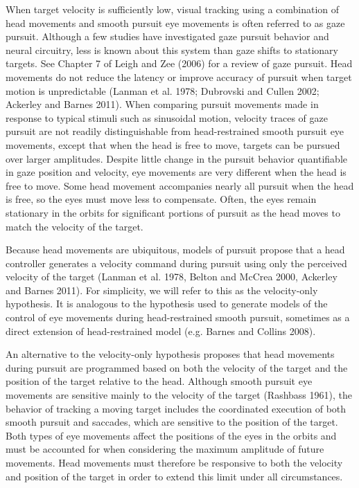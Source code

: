 \documentclass[12pt]{article}
\begin{document}
When target velocity is sufficiently low, visual tracking using a combination of head movements and smooth pursuit eye movements is often referred to as gaze pursuit. Although a few studies have investigated gaze pursuit behavior and neural circuitry, less is known about this system than gaze shifts to stationary targets. See Chapter 7 of Leigh and Zee (2006) for a review of gaze pursuit. Head movements do not reduce the latency or improve accuracy of pursuit when target motion is unpredictable (Lanman et al. 1978; Dubrovski and Cullen 2002; Ackerley and Barnes 2011). When comparing pursuit movements made in response to typical stimuli such as sinusoidal motion, velocity traces of gaze pursuit are not readily distinguishable from head-restrained smooth pursuit eye movements, except that when the head is free to move, targets can be pursued over larger amplitudes. Despite little change in the pursuit behavior quantifiable in gaze position and velocity, eye movements are very different when the head is free to move. Some head movement accompanies nearly all pursuit when the head is free, so the eyes must move less to compensate. Often, the eyes remain stationary in the orbits for significant portions of pursuit as the head moves to match the velocity of the target.

Because head movements are ubiquitous, models of pursuit propose that a head controller generates a velocity command during pursuit using only the perceived velocity of the target (Lanman et al. 1978, Belton and McCrea 2000, Ackerley and Barnes 2011). For simplicity, we will refer to this as the velocity-only hypothesis. It is analogous to the hypothesis used to generate models of the control of eye movements during head-restrained smooth pursuit, sometimes as a direct extension of head-restrained model (e.g. Barnes and Collins 2008).
 
An alternative to the velocity-only hypothesis proposes that head movements during pursuit are programmed based on both the velocity of the target and the position of the target relative to the head.  Although smooth pursuit eye movements are sensitive mainly to the velocity of the target (Rashbass 1961), the behavior of tracking a moving target includes the coordinated execution of both smooth pursuit and saccades, which are sensitive to the position of the target. Both types of eye movements affect the positions of the eyes in the orbits and must be accounted for when considering the maximum amplitude of future movements. Head movements must therefore be responsive to both the velocity and position of the target in order to extend this limit under all circumstances.
\end{document}
